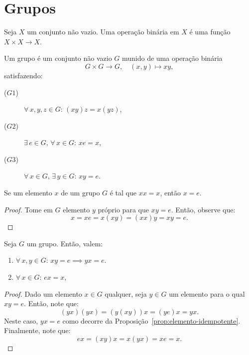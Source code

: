 \section{Grupos}\label{C01S01}

\begin{definition}\label{def:operacao-binária}
  Seja $X$ um conjunto não vazio. Uma operação binária em $X$ é uma função $X\times{X}\to{X}$.
\end{definition}

\begin{definition}\label{def:grupos}
  Um grupo é um conjunto não vazio $G$ munido de uma operação binária
  \[
    G\times{G}\to{G},\quad{(x,y)\mapsto{xy}},
  \]
  satisfazendo:
  \begin{description}
    \item[($G1$)] $\forall\,{x,y,z\in{G}}$: $(xy)z=x(yz)$,
    \item[($G2$)] $\exists\,{e\in{G}},\,\forall\,{x\in{G}}$: $xe=x$,
    \item[($G3$)] $\forall\,{x\in{G}},\,\exists\,{y\in{G}}$: $xy=e$.
  \end{description}
\end{definition}

\begin{proposition}\label{prop:elemento-idempotente}
  Se um elemento $x$ de um grupo $G$ é tal que $xx=x$, então $x=e$.
\end{proposition}

\begin{proof}
  Tome em $G$ elemento $y$ próprio para que $xy=e$. Então, observe que:
  \[
    x=xe=x(xy)=(xx)y=xy=e.
  \]
\end{proof}

\begin{proposition}\label{prop:propriedades-grupos}
  Seja $G$ um grupo. Então, valem:
  \begin{enumerate}
    \item $\forall\,{x,y\in{G}}$: $xy=e\implies{yx=e}$.
    \item $\forall\,{x\in{G}}$: $ex=x$,
  \end{enumerate}
\end{proposition}

\begin{proof}
  Dado um elemento $x\in{G}$ qualquer, seja $y\in{G}$ um elemento para o qual $xy=e$. Então, note que:
  \[
    (yx)(yx)=(y(xy))x=(ye)x=yx.
  \]
  Neste caso, $yx=e$ como decorre da Proposição~\eqref{prop:elemento-idempotente}. Finalmente, note que:
  \[
    ex=(xy)x=x(yx)=xe=x.
  \]
\end{proof}

